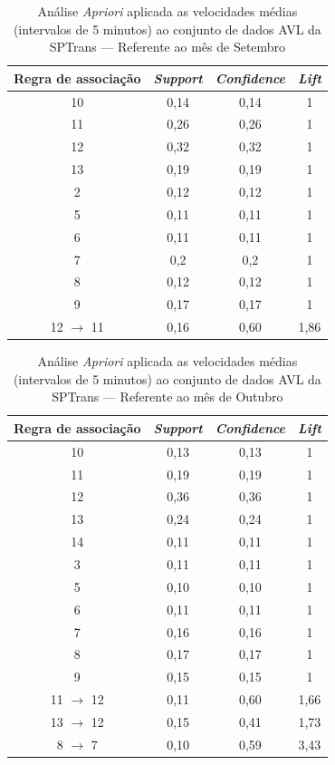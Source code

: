\documentclass[
	12pt,				%
	oneside,			%
	a4paper,			%
	english,			%
	brazil				%
	]{abntex2ppgsi}
\begin{document}
{{\begin{apendicesenv}
\begin{table}[!htb]
\centering
\caption {Análise \textit{Apriori} aplicada as velocidades médias (intervalos de 5 minutos) ao conjunto de dados AVL da SPTrans --- Referente ao mês de Setembro}
\label {tab:aprioriSeptember}
\begin{tabular}{c|c|c|c}
\toprule
\textbf{Regra de associação} & \textit{\textbf{Support}} & \textit{\textbf{Confidence}} & \textit{\textbf{Lift}} \\
\midrule
10 &  0,14 &  0,14 &  1\\
\hline
11 &  0,26 &  0,26 &  1\\
\hline
12 &  0,32 &  0,32 &  1\\
\hline
13 &  0,19 &  0,19 &  1\\
\hline
2 &  0,12 &  0,12 &  1\\
\hline
5 &  0,11 &  0,11 &  1\\
\hline
6 &  0,11 &  0,11 &  1\\
\hline
7 &  0,2 &  0,2 &  1\\
\hline
8 &  0,12 &  0,12 &  1\\
\hline
9 &  0,17 &  0,17 &  1\\
\hline
12 $\rightarrow$ 11 &  0,16 &  0,60 &  1,86\\
\bottomrule
\end{tabular}
\end{table}


\begin{table}[!htb]
\centering
\caption {Análise \textit{Apriori} aplicada as velocidades médias (intervalos de 5 minutos) ao conjunto de dados AVL da SPTrans --- Referente ao mês de Outubro}
\label {tab:aprioriOctober}
\begin{tabular}{c|c|c|c}
\toprule
\textbf{Regra de associação} & \textit{\textbf{Support}} & \textit{\textbf{Confidence}} & \textit{\textbf{Lift}} \\
\midrule
10 &  0,13 &  0,13 &  1\\
\hline
11 &  0,19 &  0,19 &  1\\
\hline
12 &  0,36 &  0,36 &  1\\
\hline
13 &  0,24 &  0,24 &  1\\
\hline
14 &  0,11 &  0,11 &  1\\
\hline
3 &  0,11 &  0,11 &  1\\
\hline
5 &  0,10 &  0,10 &  1\\
\hline
6 &  0,11 &  0,11 &  1\\
\hline
7 &  0,16 &  0,16 &  1\\
\hline
8 &  0,17 &  0,17 &  1\\
\hline
9 &  0,15 &  0,15 &  1\\
\hline
11 $\rightarrow$ 12 &  0,11 &  0,60 &  1,66\\
\hline
13 $\rightarrow$ 12 &  0,15 &  0,41 &  1,73\\
\hline
8 $\rightarrow$ 7 &  0,10 &  0,59 &  3,43\\
\bottomrule
\end{tabular}
\end{table}



\end{apendicesenv}}}
\end{document}
